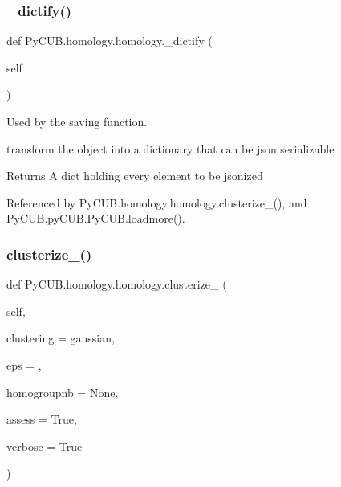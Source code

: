 \subsubsection{\texorpdfstring{\+\_\+dictify()}{\_dictify()}}
{\footnotesize\ttfamily def Py\+C\+U\+B.\+homology.\+homology.\+\_\+dictify (\begin{DoxyParamCaption}\item[{}]{self }\end{DoxyParamCaption})\hspace{0.3cm}{\ttfamily [private]}}



Used by the saving function. 

transform the object into a dictionary that can be json serializable

\begin{DoxyReturn}{Returns}
A dict holding every element to be jsonized 
\end{DoxyReturn}


Referenced by Py\+C\+U\+B.\+homology.\+homology.\+clusterize\+\_\+(), and Py\+C\+U\+B.\+py\+C\+U\+B.\+Py\+C\+U\+B.\+loadmore().

\mbox{\label{class_py_c_u_b_1_1homology_1_1homology_a7e7748ba85bf571bb04df7a26e2c682c}} 
\subsubsection{\texorpdfstring{clusterize\+\_\+()}{clusterize\_()}}
{\footnotesize\ttfamily def Py\+C\+U\+B.\+homology.\+homology.\+clusterize\+\_\+ (\begin{DoxyParamCaption}\item[{}]{self,  }\item[{}]{clustering = {\ttfamily \textquotesingle{}gaussian\textquotesingle{}},  }\item[{}]{eps = {},  }\item[{}]{homogroupnb = {\ttfamily None},  }\item[{}]{assess = {\ttfamily True},  }\item[{}]{verbose = {\ttfamily True} }\end{DoxyParamCaption})}



